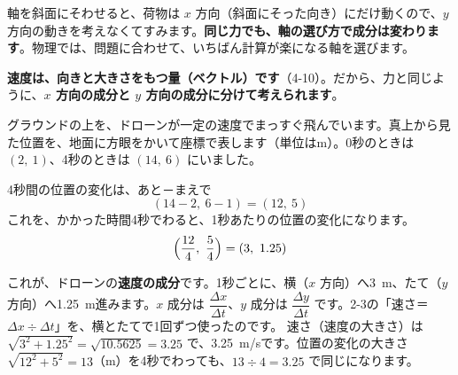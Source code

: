 \par\vspace{4pt}
軸を斜面にそわせると、荷物は $x$ 方向（斜面にそった向き）にだけ動くので、$y$ 方向の動きを考えなくてすみます。\textbf{同じ力でも、軸の選び方で成分は変わります}。物理では、問題に合わせて、いちばん計算が楽になる軸を選びます。


\label{bk:4-11:sokudo}\textbf{速度は、向きと大きさをもつ量（ベクトル）です}（4-10）。だから、力と同じように、\textbf{$x$ 方向の成分と $y$ 方向の成分に分けて考えられます}。

グラウンドの上を、ドローンが一定の速度でまっすぐ飛んでいます。真上から見た位置を、地面に方眼をかいて座標で表します（単位はm）。0秒のときは $(2,\ 1)$、4秒のときは $(14,\ 6)$ にいました。

\noindent\begin{minipage}[c]{0.52\linewidth}\centering
{}
\end{minipage}\hfill
\begin{minipage}[c]{0.45\linewidth}\raggedright 
4秒間の位置の変化は、あと－まえで
\[ (14-2,\ 6-1)=(12,\ 5) \]
これを、かかった時間4秒でわると、1秒あたりの位置の変化になります。
\[ \Bigl(\frac{12}{4},\ \frac{5}{4}\Bigr)=(3,\ 1.25) \]
\end{minipage}

\par\vspace{4pt}
これが、ドローンの\textbf{速度の成分}です。1秒ごとに、横（$x$ 方向）へ\qty{3}{m}、たて（$y$ 方向）へ\qty{1.25}{m}進みます。$x$ 成分は $\dfrac{\Delta x}{\Delta t}$、$y$ 成分は $\dfrac{\Delta y}{\Delta t}$ です。2-3の「速さ＝$\Delta x\div\Delta t$」を、横とたてで1回ずつ使ったのです。
速さ（速度の大きさ）は $\sqrt{3^2+1.25^2}=\sqrt{10.5625}=3.25$ で、\qty{3.25}{m/s}です。位置の変化の大きさ $\sqrt{12^2+5^2}=13$（m）を4秒でわっても、$13\div4=3.25$ で同じになります。

